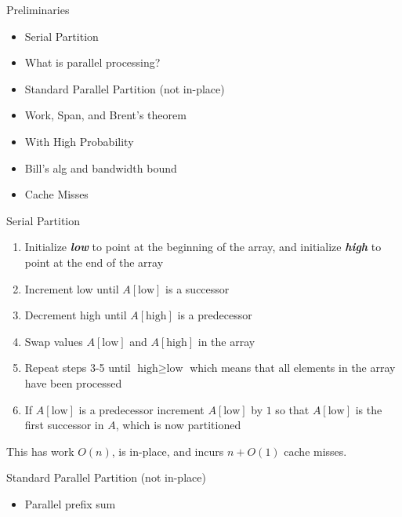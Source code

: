 \documentclass{beamer}
\newcommand{\defn}[1]       {{\textit{\textbf{\boldmath #1}}}}
\begin{document}
\begin{frame}[t]{Preliminaries}
	\begin{itemize}
		\item Serial Partition
		\item What is parallel processing?
		\item Standard Parallel Partition (not in-place)
		\item Work, Span, and Brent's theorem
		\item With High Probability
		\item Bill's alg and bandwidth bound
		\item Cache Misses
	\end{itemize}
\end{frame}

\begin{frame}[t]{Serial Partition}
\begin{enumerate}
	\item{Initialize \defn{low} to point at the beginning of the array, and initialize \defn{high} to point at the end of the array}
	\item{Increment low until $A[\text{low}]$ is a successor}
	\item{Decrement high until $A[\text{high}]$ is a predecessor}
	\item{Swap values $A[\text{low}]$ and $A[\text{high}]$ in the array}
	\item{Repeat steps 3-5 until $\text{high} \geq \text{low}$ which means that all elements in the array have been processed}
	\item{If $A[\text{low}]$ is a predecessor increment $A[\text{low}]$ by $1$ so that $A[\text{low}]$ is the first successor in $A$, which is now partitioned}
\end{enumerate}
This has work $O(n)$, is in-place, and incurs $n+O(1)$ cache misses.	
\end{frame}

\begin{frame}[t]{Standard Parallel Partition (not in-place)}
	\begin{itemize}
		\item Parallel prefix sum
	\end{itemize}
\end{frame}
\end{document}
